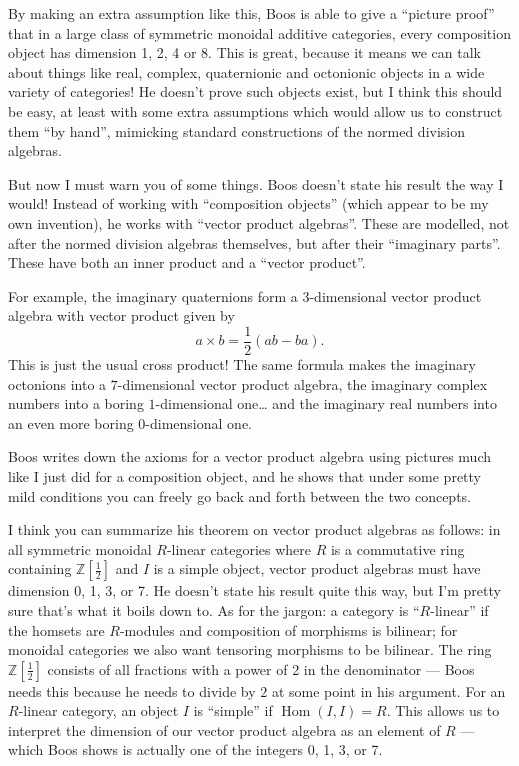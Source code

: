 \documentclass{article}
\begin{document}
By making an extra assumption like this, Boos is able to give a
``picture proof'' that in a large class of symmetric monoidal additive
categories, every composition object has dimension 1, 2, 4 or 8. This is
great, because it means we can talk about things like real, complex,
quaternionic and octonionic objects in a wide variety of categories! He
doesn't prove such objects exist, but I think this should be easy, at
least with some extra assumptions which would allow us to construct them
``by hand'', mimicking standard constructions of the normed division
algebras.

But now I must warn you of some things. Boos doesn't state his result
the way I would! Instead of working with ``composition objects'' (which
appear to be my own invention), he works with ``vector product
algebras''. These are modelled, not after the normed division algebras
themselves, but after their ``imaginary parts''. These have both an
inner product and a ``vector product''.

For example, the imaginary quaternions form a \(3\)-dimensional vector
product algebra with vector product given by
\[a\times b = \frac12(ab - ba).\] This is just the usual cross product!
The same formula makes the imaginary octonions into a \(7\)-dimensional
vector product algebra, the imaginary complex numbers into a boring
\(1\)-dimensional one\ldots{} and the imaginary real numbers into an
even more boring 0-dimensional one.

Boos writes down the axioms for a vector product algebra using pictures
much like I just did for a composition object, and he shows that under
some pretty mild conditions you can freely go back and forth between the
two concepts.

I think you can summarize his theorem on vector product algebras as
follows: in all symmetric monoidal \(R\)-linear categories where \(R\)
is a commutative ring containing \(\mathbb{Z}[\frac12]\) and \(I\) is a
simple object, vector product algebras must have dimension 0, 1, 3, or
7. He doesn't state his result quite this way, but I'm pretty sure
that's what it boils down to. As for the jargon: a category is
``\(R\)-linear'' if the homsets are \(R\)-modules and composition of
morphisms is bilinear; for monoidal categories we also want tensoring
morphisms to be bilinear. The ring \(\mathbb{Z}[\frac12]\) consists of
all fractions with a power of 2 in the denominator --- Boos needs this
because he needs to divide by \(2\) at some point in his argument. For
an \(R\)-linear category, an object \(I\) is ``simple'' if
\(\operatorname{Hom}(I,I) = R\). This allows us to interpret the
dimension of our vector product algebra as an element of \(R\) --- which
Boos shows is actually one of the integers 0, 1, 3, or 7.
\end{document}
